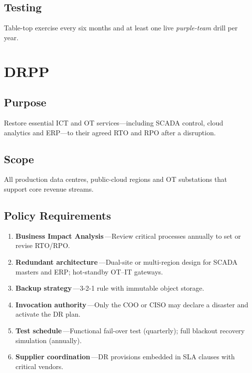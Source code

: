 \subsection*{Testing}
Table-top exercise every six months and at least one live
\emph{purple-team} drill per year.

\section{\ac{DRPP}}
\label{sec:DRPP}
\subsection*{Purpose}
Restore essential ICT and OT services—including SCADA control, cloud
analytics and ERP—to their agreed \ac{RTO} and
\ac{RPO} after a disruption.

\subsection*{Scope}
All production data centres, public-cloud regions and OT substations that
support core revenue streams.

\subsection*{Policy Requirements}
\begin{enumerate}[label=\arabic*.]
  \item \textbf{Business Impact Analysis}\,—Review critical processes
        annually to set or revise RTO/RPO.
  \item \textbf{Redundant architecture}\,—Dual-site or multi-region design
        for SCADA masters and ERP; hot-standby OT–IT gateways.
  \item \textbf{Backup strategy}\,—3-2-1 rule with immutable object
        storage.
  \item \textbf{Invocation authority}\,—Only the COO or CISO may declare a
        disaster and activate the DR plan.
  \item \textbf{Test schedule}\,—Functional fail-over test (quarterly);
        full blackout recovery simulation (annually).
  \item \textbf{Supplier coordination}\,—DR provisions embedded in SLA
        clauses with critical vendors.
\end{enumerate}

